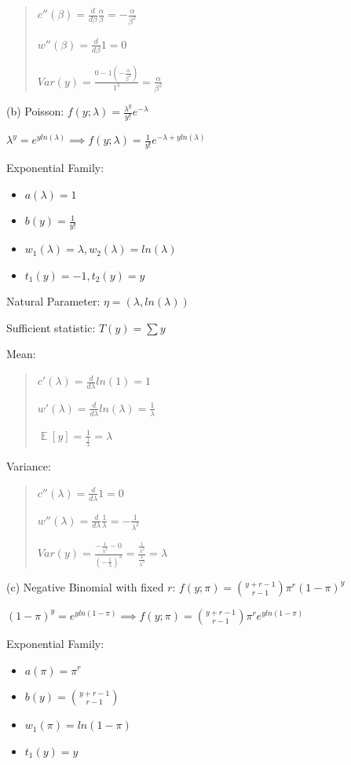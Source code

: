 \documentclass{article}
\DeclareMathOperator{\EX}{\mathbb{E}} %
\let\Oldsum=\sum
\renewcommand{\sum}{\Oldsum\limits}
\begin{document}
\begin{quote}
$c''(\beta) = \frac{d}{d \beta} \frac{\alpha}{\beta} = -\frac{\alpha}{\beta^2}$

$w''(\beta) = \frac{d}{d \beta} 1 = 0$

$Var(y) = \frac{0 - 1(-\frac{\alpha}{\beta^2})}{1^3} = \frac{\alpha}{\beta^2}$
\end{quote}

(b) Poisson: $f(y; \lambda) = \frac{\lambda^y}{y!}e^{-\lambda}$

$\lambda^y = e^{y ln(\lambda)} \implies f(y; \lambda) = \frac{1}{y!}e^{-\lambda + yln(\lambda)}$

Exponential Family: 
\begin{itemize}
    \item $a(\lambda) = 1$
    \item $b(y) = \frac{1}{y!}$
    \item $w_1(\lambda) = \lambda, w_2(\lambda) = ln(\lambda)$
    \item $t_1(y) = -1, t_2(y) = y$
\end{itemize}

Natural Parameter: $\eta = (\lambda, ln(\lambda))$

Sufficient statistic: $T(y) = \sum y$

Mean: 

\begin{quote}
$c'(\lambda) = \frac{d}{d \lambda} ln(1) = 1$

$w'(\lambda) = \frac{d}{d \lambda} ln(\lambda) = \frac{1}{\lambda}$

$\EX[y] = \frac{1}{\frac{1}{\lambda}} = \lambda$
\end{quote}

Variance: 

\begin{quote}
$c''(\lambda) = \frac{d}{d \lambda} 1 = 0$

$w''(\lambda) = \frac{d}{d \lambda} \frac{1}{\lambda} = -\frac{1}{\lambda^2}$

$Var(y) = \frac{-\frac{1}{\lambda^2} - 0}{(-\frac{1}{\lambda})^3} = \frac{\frac{1}{\lambda^2}}{\frac{1}{\lambda^3}} = \lambda$
\end{quote}

(c) Negative Binomial with fixed $r$: $f(y; \pi) = \binom{y+r-1}{r-1} \pi^r (1-\pi)^y$

$(1-\pi)^y = e^{yln(1-\pi)} \implies f(y; \pi) = \binom{y+r-1}{r-1} \pi^r e^{yln(1-\pi)}$

Exponential Family: 
\begin{itemize}
    \item $a(\pi) = \pi^r$
    \item $b(y) = \binom{y+r-1}{r-1}$
    \item $w_1(\pi) = ln(1-\pi)$
    \item $t_1(y) = y$
\end{itemize}
\end{document}
